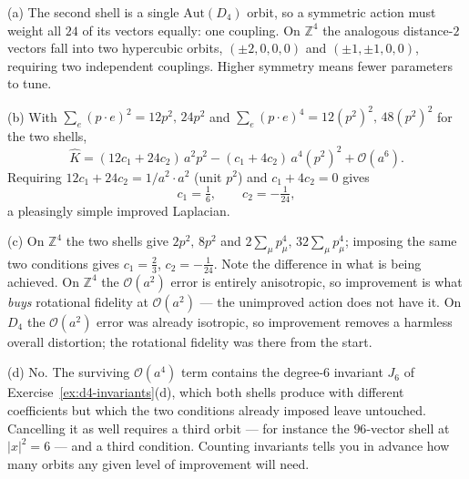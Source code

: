 {(a) The second shell is a single $\mathrm{Aut}(D_4)$ orbit, so a symmetric
action must weight all $24$ of its vectors equally: one coupling. On
$\mathbb{Z}^4$ the analogous distance-$2$ vectors fall into two hypercubic
orbits, $(\pm2,0,0,0)$ and $(\pm1,\pm1,0,0)$, requiring two independent
couplings. Higher symmetry means fewer parameters to tune.

(b) With $\sum_e (p\!\cdot\!e)^2 = 12p^2,\,24p^2$ and
$\sum_e (p\!\cdot\!e)^4 = 12(p^2)^2,\,48(p^2)^2$ for the two shells,
\begin{equation}
  \widehat{K} = (12c_1+24c_2)\,a^2p^2 - (c_1+4c_2)\,a^4 (p^2)^2 + \mathcal{O}(a^6).
\end{equation}
Requiring $12c_1+24c_2 = 1/a^2 \cdot a^2$ (unit $p^2$) and $c_1+4c_2=0$ gives
\begin{equation}
  c_1 = \tfrac16, \qquad c_2 = -\tfrac1{24},
\end{equation}
a pleasingly simple improved Laplacian.

(c) On $\mathbb{Z}^4$ the two shells give $2p^2,\,8p^2$ and
$2\sum_\mu p_\mu^4,\,32\sum_\mu p_\mu^4$; imposing the same two conditions
gives $c_1=\tfrac23$, $c_2=-\tfrac1{24}$. Note the difference in what is being
achieved. On $\mathbb{Z}^4$ the $\mathcal{O}(a^2)$ error is entirely
anisotropic, so improvement is what \emph{buys} rotational fidelity at
$\mathcal{O}(a^2)$ --- the unimproved action does not have it. On $D_4$ the
$\mathcal{O}(a^2)$ error was already isotropic, so improvement removes a
harmless overall distortion; the rotational fidelity was there from the start.

(d) No. The surviving $\mathcal{O}(a^4)$ term contains the degree-$6$ invariant
$J_6$ of Exercise~\ref{ex:d4-invariants}(d), which both shells produce with
different coefficients but which the two conditions already imposed leave
untouched. Cancelling it as well requires a third orbit --- for instance the
$96$-vector shell at $|x|^2=6$ --- and a third condition. Counting invariants
tells you in advance how many orbits any given level of improvement will need.}

